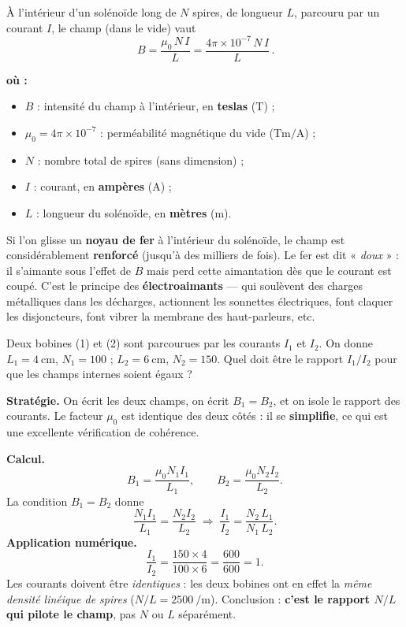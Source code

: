 \documentclass[11pt,a4paper]{article}
\newenvironment{ou}{%
  \par\smallskip\noindent\textbf{où :}\nopagebreak
  \begin{itemize}[leftmargin=1.8em,topsep=2pt,itemsep=1.5pt,parsep=0pt]}%
  {\end{itemize}}
\begin{document}
\begin{formule}
À l'intérieur d'un solénoïde long de $N$ spires, de longueur $L$, parcouru par un courant $I$,
le champ (dans le vide) vaut
\[ \boxed{\,B = \dfrac{\mu_0\, N\, I}{L} = \dfrac{4\pi\times 10^{-7}\, N\, I}{L}\,}. \]
\begin{ou}
  \item $B$ : intensité du champ à l'intérieur, en \textbf{teslas} (\si{\tesla}) ;
  \item $\mu_0 = 4\pi\times 10^{-7}$ : perméabilité magnétique du vide
        ($\si{\tesla\metre\per\ampere}$) ;
  \item $N$ : nombre total de spires (sans dimension) ;
  \item $I$ : courant, en \textbf{ampères} (\si{\ampere}) ;
  \item $L$ : longueur du solénoïde, en \textbf{mètres} (\si{\metre}).
\end{ou}
\end{formule}

\begin{remarque}
Si l'on glisse un \textbf{noyau de fer} à l'intérieur du solénoïde, le champ est considérablement
\textbf{renforcé} (jusqu'à des milliers de fois). Le fer est dit « \emph{doux} » : il s'aimante
sous l'effet de $B$ mais perd cette aimantation dès que le courant est coupé. C'est le principe des
\textbf{électroaimants} — qui soulèvent des charges métalliques dans les décharges, actionnent les
sonnettes électriques, font claquer les disjoncteurs, font vibrer la membrane des haut-parleurs, etc.
\end{remarque}

\begin{exemple}
Deux bobines (1) et (2) sont parcourues par les courants $I_1$ et $I_2$. On donne
$L_1=\SI{4}{\centi\metre}$, $N_1=100$ ; $L_2=\SI{6}{\centi\metre}$, $N_2=150$. Quel doit être le
rapport $I_1/I_2$ pour que les champs internes soient égaux ?

\smallskip
\textbf{Stratégie.} On écrit les deux champs, on écrit $B_1=B_2$, et on isole le rapport des courants.
Le facteur $\mu_0$ est identique des deux côtés : il se \textbf{simplifie}, ce qui est une excellente
vérification de cohérence.

\smallskip
\textbf{Calcul.}
\[ B_1 = \dfrac{\mu_0 N_1 I_1}{L_1},\qquad B_2 = \dfrac{\mu_0 N_2 I_2}{L_2}. \]
La condition $B_1=B_2$ donne
\[ \dfrac{N_1 I_1}{L_1} = \dfrac{N_2 I_2}{L_2}
   \;\Longrightarrow\;
   \dfrac{I_1}{I_2} = \dfrac{N_2\, L_1}{N_1\, L_2}. \]
\textbf{Application numérique.}
\[ \dfrac{I_1}{I_2} = \dfrac{150\times 4}{100\times 6} = \dfrac{600}{600} = 1. \]
Les courants doivent être \emph{identiques} : les deux bobines ont en effet la \emph{même densité
linéique de spires} ($N/L = \SI{2500}{\per\metre}$). Conclusion : \textbf{c'est le rapport $N/L$
qui pilote le champ}, pas $N$ ou $L$ séparément.
\end{exemple}
\end{document}
